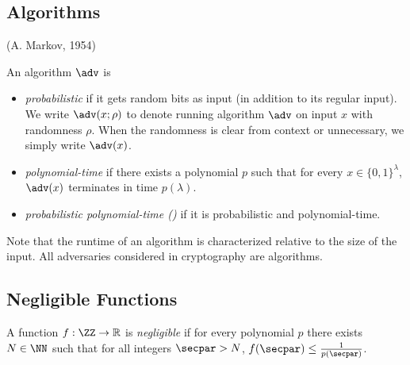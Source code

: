 \subsection{Algorithms}

 (A. Markov, 1954)

\begin{definition}
An algorithm $\adv$ is
\begin{itemize}
\item \emph{probabilistic} if it gets random bits as input (in addition to its regular input).
We write $\adv(x; \rho)$ to denote running algorithm $\adv$ on input $x$ with randomness $\rho$.
When the randomness is clear from context or unnecessary, we simply write $\adv(x)$.
\item \emph{polynomial-time} if there exists a polynomial $p$ such that for every $x \in \{0,1\}^\lambda$, $\adv(x)$ terminates in time $p(\lambda)$.
\item \emph{probabilistic polynomial-time (\ppt)} if it is probabilistic and polynomial-time.
\end{itemize}
\end{definition}

Note that the runtime of an algorithm is characterized relative to the size of the input.
All adversaries considered in cryptography are algorithms.

\subsection{Negligible Functions}



\begin{definition}
A function $f: \ZZ \rightarrow \mathbb{R}$ is \emph{negligible} if for every polynomial $p$ there exists $N \in \NN$ such that for all integers $\secpar > N$, $f(\secpar) \le \frac{1}{p(\secpar)}$.
\end{definition}

